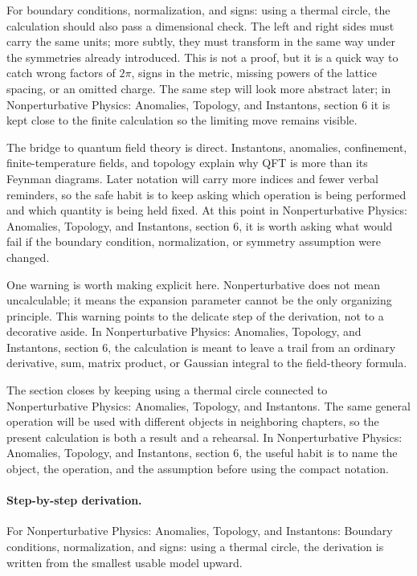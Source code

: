 For boundary conditions, normalization, and signs: using a thermal circle, the calculation should also pass a dimensional check.  The left and right sides must carry the same units; more subtly, they must transform in the same way under the symmetries already introduced.  This is not a proof, but it is a quick way to catch wrong factors of \(2\pi\), signs in the metric, missing powers of the lattice spacing, or an omitted charge.  The same step will look more abstract later; in Nonperturbative Physics: Anomalies, Topology, and Instantons, section 6 it is kept close to the finite calculation so the limiting move remains visible.

The bridge to quantum field theory is direct.  Instantons, anomalies, confinement, finite-temperature fields, and topology explain why QFT is more than its Feynman diagrams.  Later notation will carry more indices and fewer verbal reminders, so the safe habit is to keep asking which operation is being performed and which quantity is being held fixed.  At this point in Nonperturbative Physics: Anomalies, Topology, and Instantons, section 6, it is worth asking what would fail if the boundary condition, normalization, or symmetry assumption were changed.

One warning is worth making explicit here.  Nonperturbative does not mean uncalculable; it means the expansion parameter cannot be the only organizing principle.  This warning points to the delicate step of the derivation, not to a decorative aside.  In Nonperturbative Physics: Anomalies, Topology, and Instantons, section 6, the calculation is meant to leave a trail from an ordinary derivative, sum, matrix product, or Gaussian integral to the field-theory formula.

The section closes by keeping using a thermal circle connected to Nonperturbative Physics: Anomalies, Topology, and Instantons.  The same general operation will be used with different objects in neighboring chapters, so the present calculation is both a result and a rehearsal.  In Nonperturbative Physics: Anomalies, Topology, and Instantons, section 6, the useful habit is to name the object, the operation, and the assumption before using the compact notation.



\paragraph{Step-by-step derivation.}

For Nonperturbative Physics: Anomalies, Topology, and Instantons: Boundary conditions, normalization, and signs: using a thermal circle, the derivation is written from the smallest usable model upward.

